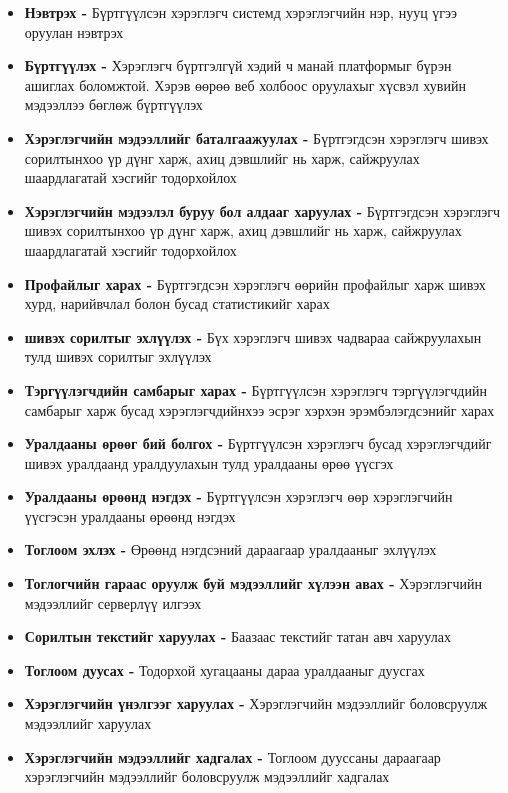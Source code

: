 \begin{itemize}
	\item \textbf{Нэвтрэх -} Бүртгүүлсэн хэрэглэгч системд хэрэглэгчийн нэр, нууц үгээ оруулан нэвтрэх
	\item \textbf{Бүртгүүлэх -} Хэрэглэгч бүртгэлгүй хэдий ч манай платформыг бүрэн ашиглах боломжтой. Хэрэв өөрөө веб холбоос оруулахыг хүсвэл хувийн мэдээллээ бөглөж бүртгүүлэх
	\item \textbf{Хэрэглэгчийн мэдээллийг баталгаажуулах -} Бүртгэгдсэн хэрэглэгч шивэх сорилтынхоо үр дүнг харж, ахиц дэвшлийг нь харж, сайжруулах шаардлагатай хэсгийг тодорхойлох
	\item \textbf{Хэрэглэгчийн мэдээлэл буруу бол алдааг харуулах -} Бүртгэгдсэн хэрэглэгч шивэх сорилтынхоо үр дүнг харж, ахиц дэвшлийг нь харж, сайжруулах шаардлагатай хэсгийг тодорхойлох
	\item \textbf{Профайлыг харах -} Бүртгэгдсэн хэрэглэгч өөрийн профайлыг харж шивэх хурд, нарийвчлал болон бусад статистикийг харах
	\item \textbf{шивэх сорилтыг эхлүүлэх -} Бүх хэрэглэгч шивэх чадвараа сайжруулахын тулд шивэх сорилтыг эхлүүлэх
	\item \textbf{Тэргүүлэгчдийн самбарыг харах -} Бүртгүүлсэн хэрэглэгч тэргүүлэгчдийн самбарыг харж бусад хэрэглэгчдийнхээ эсрэг хэрхэн эрэмбэлэгдсэнийг харах
	\item \textbf{Уралдааны өрөөг бий болгох -} Бүртгүүлсэн хэрэглэгч бусад хэрэглэгчдийг шивэх уралдаанд уралдуулахын тулд уралдааны өрөө үүсгэх
	\item \textbf{Уралдааны өрөөнд нэгдэх -} Бүртгүүлсэн хэрэглэгч өөр хэрэглэгчийн үүсгэсэн уралдааны өрөөнд нэгдэх
	\item \textbf{Тоглоом эхлэх -} Өрөөнд нэгдсэний дараагаар уралдааныг эхлүүлэх
	\item \textbf{Тоглогчийн гараас оруулж буй мэдээллийг хүлээн авах -} Хэрэглэгчийн мэдээллийг серверлүү илгээх
	\item \textbf{Сорилтын текстийг харуулах -} Баазаас текстийг татан авч харуулах
	\item \textbf{Тоглоом дуусах -} Тодорхой хугацааны дараа уралдааныг дуусгах
	\item \textbf{Хэрэглэгчийн  үнэлгээг харуулах -} Хэрэглэгчийн мэдээллийг боловсруулж мэдээллийг харуулах
	\item \textbf{Хэрэглэгчийн мэдээллийг хадгалах -} Тоглоом дууссаны дараагаар хэрэглэгчийн мэдээллийг боловсруулж мэдээллийг хадгалах
\end{itemize}

